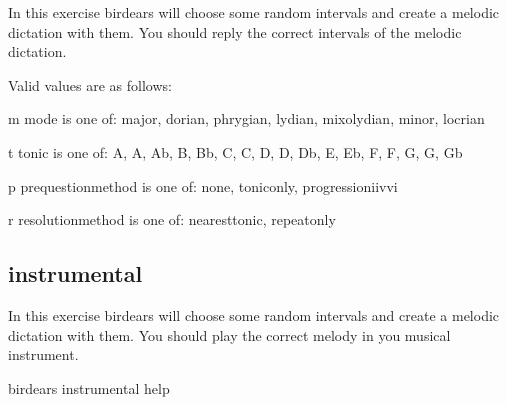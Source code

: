 \documentclass[letterpaper,10pt,english]{sphinxmanual}
\begin{document}
\begin{sphinxVerbatim}[commandchars=\\\{\}]
  In this exercise birdears will choose some random intervals and create a
  melodic dictation with them. You should reply the correct intervals of the
  melodic dictation.

  Valid values are as follows:

  \PYGZhy{}m \PYGZlt{}mode\PYGZgt{} is one of: major, dorian, phrygian, lydian, mixolydian, minor,
  locrian

  \PYGZhy{}t \PYGZlt{}tonic\PYGZgt{} is one of: A, A\PYGZsh{}, Ab, B, Bb, C, C\PYGZsh{}, D, D\PYGZsh{}, Db, E, Eb, F, F\PYGZsh{}, G,
  G\PYGZsh{}, Gb

  \PYGZhy{}p \PYGZlt{}prequestion\PYGZus{}method\PYGZgt{} is one of: none, tonic\PYGZus{}only, progression\PYGZus{}i\PYGZus{}iv\PYGZus{}v\PYGZus{}i

  \PYGZhy{}r \PYGZlt{}resolution\PYGZus{}method\PYGZgt{} is one of: nearest\PYGZus{}tonic, repeat\PYGZus{}only
\end{sphinxVerbatim}


\subsection{instrumental}
\label{\detokenize{index:instrumental}}
In this exercise birdears will choose some random intervals and create a
melodic dictation with them. You should play the correct melody in you
musical instrument.

\begin{sphinxVerbatim}[commandchars=\\\{\}]
birdears instrumental \PYGZhy{}\PYGZhy{}help
\end{sphinxVerbatim}
\end{document}
